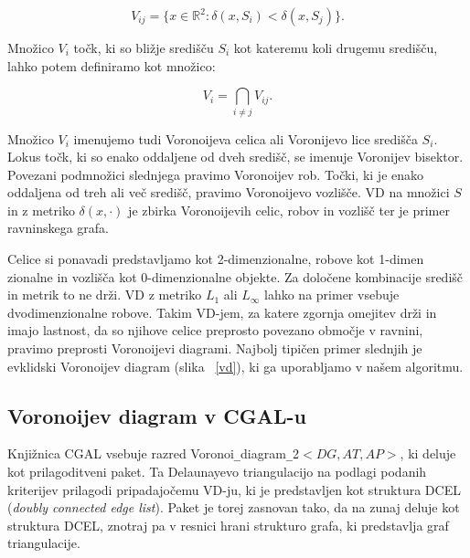 \documentclass[a4paper, 12pt]{book}
\begin{document}
\begin{equation}
V_{ij} = \{x \in \mathbb{R}^2: \delta(x,S_i) < \delta(x,S_j)\}. 
\end{equation}

Množico $V_i$ točk, ki so bližje središču $S_i$ kot kateremu koli drugemu središču, lahko potem definiramo kot množico:

\begin{equation}
V_i = \bigcap_{i \neq j} V_{ij} .
\end{equation}



Množico $V_i$ imenujemo tudi Voronoijeva celica ali Voronijevo lice središča $S_i$. Lokus točk, ki so enako oddaljene od dveh središč, se imenuje Voronijev bisektor. Povezani podmnožici slednjega pravimo Voronoijev rob. Točki, ki je enako oddaljena od treh ali več središč, pravimo Voronoijevo vozlišče. VD na množici $S$ in z metriko $\delta(x,\cdot)$ je zbirka Voronoijevih celic, robov in vozlišč ter je primer ravninskega grafa.

Celice si ponavadi predstavljamo kot 2-dimenzionalne, robove kot 1-dimen\- zionalne in vozlišča kot 0-dimenzionalne objekte. Za določene kombinacije središč in metrik to ne drži. VD z metriko $L_1$ ali $L_{\infty}$ lahko na primer vsebuje dvodimenzionalne robove. Takim VD-jem, za katere zgornja omejitev drži in imajo lastnost, da so njihove celice preprosto povezano območje v ravnini, pravimo preprosti Voronoijevi diagrami. Najbolj tipičen primer slednjih je evklidski Voronoijev diagram (slika ~\ref{vd}), ki ga uporabljamo v našem algoritmu.

\subsection{Voronoijev diagram v CGAL-u}
Knjižnica CGAL vsebuje razred Voronoi\texttt{\_}diagram\texttt{\_}2$<DG,AT,AP>$, ki deluje kot prilagoditveni paket. Ta Delaunayevo triangulacijo na podlagi podanih kriterijev prilagodi pripadajočemu VD-ju, ki je predstavljen kot struktura DCEL (\textit{doubly connected edge list}). Paket je torej zasnovan tako, da na zunaj deluje kot struktura DCEL, znotraj pa v resnici hrani strukturo grafa, ki predstavlja graf triangulacije.
\end{document}
